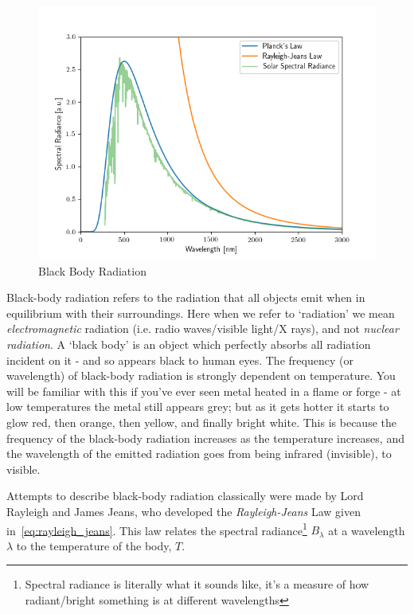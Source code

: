 \documentclass{memoir}[11pt,oneside,a4paper,openany]
\begin{document}
\begin{figure}
	\includegraphics[width=\linewidth]{black_body.png}
	\caption{Black Body Radiation}\label{fig:black_body}
\end{figure}

Black-body radiation refers to the radiation that all objects emit when in equilibrium with their surroundings. Here when we refer to `radiation' we mean \emph{electromagnetic} radiation (i.e. radio waves/visible light/X rays), and not \emph{nuclear radiation}. A `black body' is an object which perfectly absorbs all radiation incident on it - and so appears black to human eyes. The frequency (or wavelength) of black-body radiation is strongly dependent on temperature. You will be familiar with this if you've ever seen metal heated in a flame or forge - at low temperatures the metal still appears grey; but as it gets hotter it starts to glow red, then orange, then yellow, and finally bright white. This is because the frequency of the black-body radiation increases as the temperature increases, and the wavelength of the emitted radiation goes from being infrared (invisible), to visible. 

Attempts to describe black-body radiation classically were made by Lord Rayleigh and James Jeans, who developed the \emph{Rayleigh-Jeans} Law given in~\autoref{eq:rayleigh_jeans}. This law relates the spectral radiance\footnote{Spectral radiance is literally what it sounds like, it's a measure of how radiant/bright something is at different wavelengths} $B_\lambda$ at a wavelength $\lambda$ to the temperature of the body, $T$.
\end{document}
